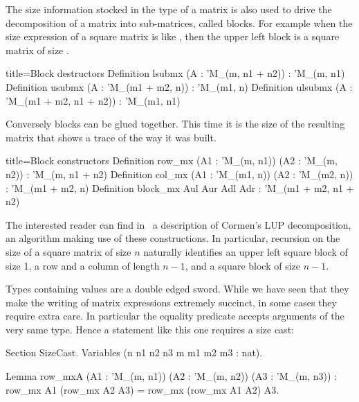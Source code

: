 
The size information stocked in the type of a matrix is
also used to drive the decomposition of a matrix into sub-matrices,
called blocks.  For example when the size expression of a square
matrix is like , then the upper left block
is a square matrix of size .

\begin{coq}{}{title=Block destructors}
Definition lsubmx (A : 'M_(m, n1 + n2)) : 'M_(m, n1)
Definition usubmx (A : 'M_(m1 + m2, n)) : 'M_(m1, n)
Definition ulsubmx (A : 'M_(m1 + m2, n1 + n2)) : 'M_(m1, n1)
\end{coq}
Conversely blocks can be glued together.  This time it is the
size of the resulting matrix that shows a trace of the way
it was built.

\begin{coq}{}{title=Block constructors}
Definition row_mx (A1 : 'M_(m, n1)) (A2 : 'M_(m, n2)) : 'M_(m, n1 + n2)
Definition col_mx (A1 : 'M_(m1, n)) (A2 : 'M_(m2, n)) : 'M_(m1 + m2, n)
Definition block_mx Aul Aur Adl Adr : 'M_(m1 + m2, n1 + n2)
\end{coq}

The interested reader can find in~\cite{packedclasses}
a description of Cormen's LUP decomposition, an algorithm
making use of these constructions.  In particular, recursion
on the size of a square matrix of size $n$ naturally identifies
an upper left square block of size 1, a row and a column of length $n-1$,
and a square block of size $n-1$.

\label{sec:castmx}

Types containing values are a double edged sword.  While we have seen that
they make the writing of matrix expressions extremely succinct, in
some cases
they require extra care.  In particular the equality predicate accepts
arguments of the very same type.  Hence a statement like this one
requires a size cast:

\begin{coq}{}{}
Section SizeCast.
Variables (n n1 n2 n3 m m1 m2 m3 : nat).

Lemma row_mxA (A1 : 'M_(m, n1)) (A2 : 'M_(m, n2)) (A3 : 'M_(m, n3)) :
  row_mx A1 (row_mx A2 A3) = row_mx (row_mx A1 A2) A3.
\end{coq}

